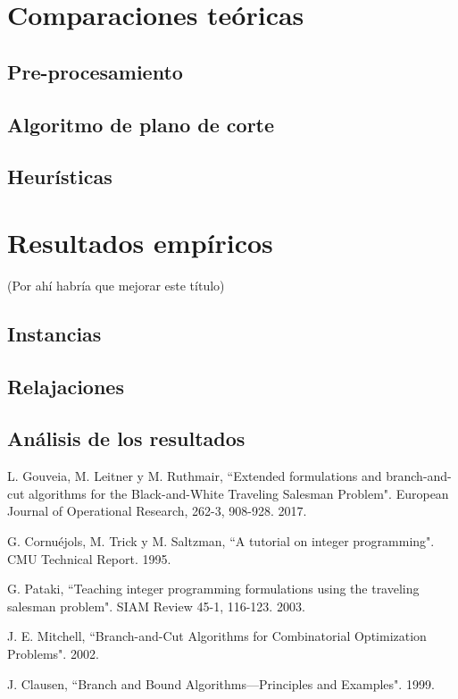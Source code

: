 \documentclass[10pt, a4paper]{article}
\theoremstyle{definition}
\begin{document}
\section{Comparaciones teóricas}

\subsection{Pre-procesamiento}

\subsection{Algoritmo de plano de corte}

\subsection{Heurísticas}

\section{Resultados empíricos}

(Por ahí habría que mejorar este título)

\subsection{Instancias}

\subsection{Relajaciones}

\subsection{Análisis de los resultados}

\pagebreak

\begin{thebibliography}{9}

L. Gouveia, M. Leitner y M. Ruthmair, “Extended formulations and branch-and-cut algorithms for the Black-and-White Traveling Salesman Problem". European Journal of Operational Research, 262-3, 908-928. 2017.

G. Cornuéjols, M. Trick y M. Saltzman, “A tutorial on integer programming". CMU Technical Report. 1995.

G. Pataki, “Teaching integer programming formulations using the traveling salesman problem". SIAM Review 45-1, 116-123. 2003.

J. E. Mitchell, “Branch-and-Cut Algorithms for Combinatorial Optimization Problems". 2002.

J. Clausen, “Branch and Bound Algorithms—Principles and Examples". 1999.

\end{thebibliography}
\end{document}
